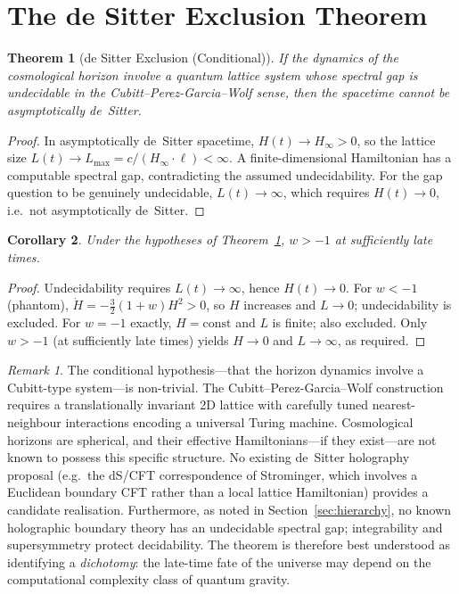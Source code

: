 \documentclass[12pt,a4paper]{article}
\newtheorem{theorem}{Theorem}
\newtheorem{corollary}[theorem]{Corollary}
\theoremstyle{remark}
\newtheorem{remark}{Remark}
\begin{document}
\section{The de Sitter Exclusion Theorem}

\begin{theorem}[de Sitter Exclusion (Conditional)]\label{thm:dS}
If the dynamics of the cosmological horizon involve a quantum lattice system whose spectral gap is undecidable in the Cubitt--Perez-Garcia--Wolf sense, then the spacetime cannot be asymptotically de~Sitter.
\end{theorem}

\begin{proof}
In asymptotically de~Sitter spacetime, $H(t)\to H_\infty > 0$, so the lattice size $L(t)\to L_{\max} = c/(H_\infty\cdot\ell) < \infty$.
A finite-dimensional Hamiltonian has a computable spectral gap, contradicting the assumed undecidability.
For the gap question to be genuinely undecidable, $L(t)\to\infty$, which requires $H(t)\to 0$, i.e.\ not asymptotically de~Sitter.
\end{proof}

\begin{corollary}
Under the hypotheses of Theorem~\ref{thm:dS}, $w > -1$ at sufficiently late times.
\end{corollary}

\begin{proof}
Undecidability requires $L(t) \to \infty$, hence $H(t) \to 0$.
For $w < -1$ (phantom), $\dot H = -\tfrac{3}{2}(1+w)H^2 > 0$, so $H$ increases and $L \to 0$; undecidability is excluded.
For $w = -1$ exactly, $H = \mathrm{const}$ and $L$ is finite; also excluded.
Only $w > -1$ (at sufficiently late times) yields $H \to 0$ and $L \to \infty$, as required.
\end{proof}

\begin{remark}
The conditional hypothesis---that the horizon dynamics involve a Cubitt-type system---is non-trivial.
The Cubitt--Perez-Garcia--Wolf construction requires a translationally invariant 2D lattice with carefully tuned nearest-neighbour interactions encoding a universal Turing machine.
Cosmological horizons are spherical, and their effective Hamiltonians---if they exist---are not known to possess this specific structure.
No existing de~Sitter holography proposal (e.g.\ the dS/CFT correspondence of Strominger, which involves a Euclidean boundary CFT rather than a local lattice Hamiltonian) provides a candidate realisation.
Furthermore, as noted in Section~\ref{sec:hierarchy}, no known holographic boundary theory has an undecidable spectral gap; integrability and supersymmetry protect decidability.
The theorem is therefore best understood as identifying a \emph{dichotomy}: the late-time fate of the universe may depend on the computational complexity class of quantum gravity.
\end{remark}
\end{document}
